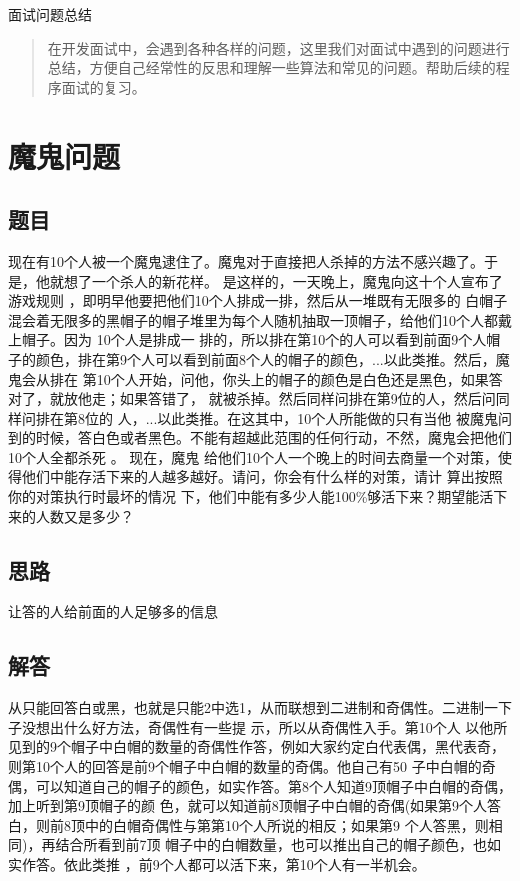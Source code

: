 \documentclass[UTF8]{ctexart}
\begin{document}
面试问题总结
\begin{abstract}
    在开发面试中，会遇到各种各样的问题，这里我们对面试中遇到的问题进行总结，方便自己经常性的反思和理解一些算法和常见的问题。帮助后续的程序面试的复习。
\end{abstract}

\section{魔鬼问题}
\subsection{题目}
现在有10个人被一个魔鬼逮住了。魔鬼对于直接把人杀掉的方法不感兴趣了。于是，他就想了一个杀人的新花样。
是这样的，一天晚上，魔鬼向这十个人宣布了游戏规则 ，即明早他要把他们10个人排成一排，然后从一堆既有无限多的
白帽子混会着无限多的黑帽子的帽子堆里为每个人随机抽取一顶帽子，给他们10个人都戴上帽子。因为 10个人是排成一
排的，所以排在第10个的人可以看到前面9个人帽子的颜色，排在第9个人可以看到前面8个人的帽子的颜色，...以此类推。然后，魔鬼会从排在 第10个人开始，问他，你头上的帽子的颜色是白色还是黑色，如果答对了，就放他走；如果答错了，
就被杀掉。然后同样问排在第9位的人，然后问同样问排在第8位的 人，...以此类推。在这其中，10个人所能做的只有当他
被魔鬼问到的时候，答白色或者黑色。不能有超越此范围的任何行动，不然，魔鬼会把他们10个人全都杀死 。 现在，魔鬼
给他们10个人一个晚上的时间去商量一个对策，使得他们中能存活下来的人越多越好。请问，你会有什么样的对策，请计
算出按照你的对策执行时最坏的情况 下，他们中能有多少人能100\%够活下来？期望能活下来的人数又是多少？
\subsection{思路}
 让答的人给前面的人足够多的信息
 \subsection{解答}
从只能回答白或黑，也就是只能2中选1，从而联想到二进制和奇偶性。二进制一下子没想出什么好方法，奇偶性有一些提
示，所以从奇偶性入手。第10个人 以他所见到的9个帽子中白帽的数量的奇偶性作答，例如大家约定白代表偶，黑代表奇，
则第10个人的回答是前9个帽子中白帽的数量的奇偶。他自己有50%
子中白帽的奇偶，可以知道自己的帽子的颜色，如实作答。第8个人知道9顶帽子中白帽的奇偶，加上听到第9顶帽子的颜 
色，就可以知道前8顶帽子中白帽的奇偶(如果第9个人答白，则前8顶中的白帽奇偶性与第第10个人所说的相反；如果第9
个人答黑，则相同)，再结合所看到前7顶 帽子中的白帽数量，也可以推出自己的帽子颜色，也如实作答。依此类推
，前9个人都可以活下来，第10个人有一半机会。
\end{document}
